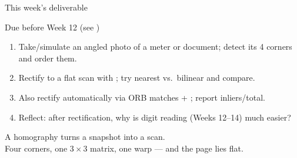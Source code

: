 \documentclass[10pt,aspectratio=169]{beamer}
\begin{document}
\begin{frame}{This week's deliverable}
  \begin{alertblock}{Due before Week 12 (see )}
    \begin{enumerate}
      \item Take/simulate an angled photo of a meter or document; detect its 4 corners and order them.
      \item Rectify to a flat scan with ; try nearest vs.\ bilinear and compare.
      \item Also rectify automatically via ORB matches + ; report inliers/total.
      \item Reflect: after rectification, why is digit reading (Weeks 12--14) much easier?
    \end{enumerate}
  \end{alertblock}
\end{frame}

\begin{frame}[standout]
  A homography turns a snapshot into a scan.\\[4pt]
  \normalsize Four corners, one $3\times3$ matrix, one warp — and the page lies flat.
\end{frame}
\end{document}
